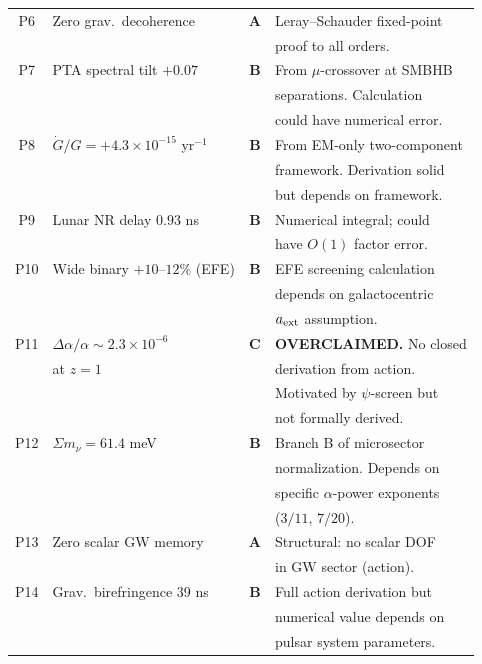 \documentclass[11pt]{article}
\begin{document}
\begin{longtable}{clcl}
P6 & Zero grav.\ decoherence & \textbf{A} &
  Leray--Schauder fixed-point \\
  & & & proof to all orders. \\

P7 & PTA spectral tilt $+0.07$ & \textbf{B} &
  From $\mu$-crossover at SMBHB \\
  & & & separations.  Calculation \\
  & & & could have numerical error. \\

P8 & $\dot{G}/G = +4.3 \times 10^{-15}$ yr$^{-1}$ & \textbf{B} &
  From EM-only two-component \\
  & & & framework.  Derivation solid \\
  & & & but depends on framework. \\

P9 & Lunar NR delay $0.93$ ns & \textbf{B} &
  Numerical integral; could \\
  & & & have $O(1)$ factor error. \\

P10 & Wide binary $+10$--$12\%$ (EFE) & \textbf{B} &
  EFE screening calculation \\
  & & & depends on galactocentric \\
  & & & $a_{\rm ext}$ assumption. \\

P11 & $\Delta\alpha/\alpha \sim 2.3 \times 10^{-6}$ & \textbf{C} &
  \textbf{OVERCLAIMED.}  No closed \\
  & at $z=1$ & & derivation from action.  \\
  & & & Motivated by $\psi$-screen but \\
  & & & not formally derived. \\

P12 & $\Sigma m_\nu = 61.4$ meV & \textbf{B} &
  Branch B of microsector \\
  & & & normalization.  Depends on \\
  & & & specific $\alpha$-power exponents \\
  & & & ($3/11$, $7/20$). \\

P13 & Zero scalar GW memory & \textbf{A} &
  Structural: no scalar DOF \\
  & & & in GW sector (action). \\

P14 & Grav.\ birefringence 39 ns & \textbf{B} &
  Full action derivation but \\
  & & & numerical value depends on \\
  & & & pulsar system parameters. \\


\end{longtable}
\end{document}
